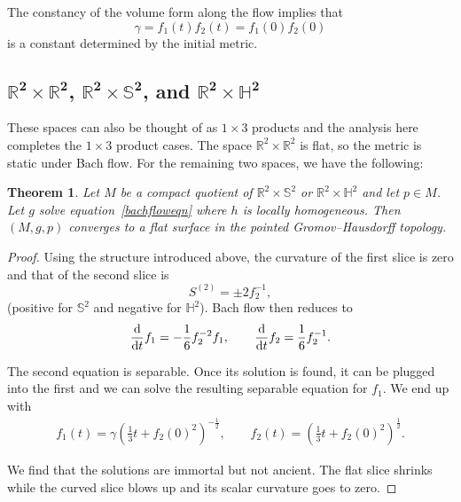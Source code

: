 \documentclass[pdftex]{sigma}
\numberwithin{equation}{section}
\newtheorem{Theorem}{Theorem}[section]
\newcommand{\dtime}{\frac{{\rm d}}{{\rm d} t}} %
\begin{document}
The constancy of the volume form along the flow implies that
\[
\gamma = f_1(t) f_2(t) = f_1(0) f_2(0)
\]
is a constant determined by the initial metric.

\subsection[$\mathbb{R}^2 \times \mathbb{R}^2$, $\mathbb{R}^2 \times \mathbb{S}^2$, and $\mathbb{R}^2 \times \mathbb{H}^2$]{$\boldsymbol{\mathbb{R}^2 \times \mathbb{R}^2}$, $\boldsymbol{\mathbb{R}^2 \times \mathbb{S}^2}$, and $\boldsymbol{\mathbb{R}^2 \times \mathbb{H}^2}$}

These spaces can also be thought of as $1 \times 3$ products and the analysis here completes the $1 \times 3$ product cases. The space $\mathbb{R}^2 \times \mathbb{R}^2$ is flat, so the metric is static under Bach flow. For the remaining two spaces, we have the following:

\begin{Theorem}Let $M$ be a compact quotient of $\mathbb{R}^2 \times \mathbb{S}^2$ or $\mathbb{R}^2 \times \mathbb{H}^2$ and let $p \in M$. Let $g$ solve equation~\eqref{bachfloweqn} where $h$ is locally homogeneous. Then $(M, g, p)$ converges to a flat surface in the pointed Gromov--Hausdorff topology.
\end{Theorem}

\begin{proof}Using the structure introduced above, the curvature of the first slice is zero and that of the second slice is
\[
S^{(2)} = \pm 2 f_2^{-1},
\]
(positive for $\mathbb{S}^2$ and negative for $\mathbb{H}^2$). Bach flow then reduces to
\begin{equation*}
\dtime f_1 = -\frac{1}{6} f_2^{-2} f_1,\qquad
\dtime f_2 = \frac{1}{6} f_2^{-1}.
\end{equation*}

The second equation is separable. Once its solution is found, it can be plugged into the first and we can solve the resulting separable equation for $f_1$. We end up with
\begin{gather*}
f_1(t) = \gamma \left(\frac{1}{3} t + f_2(0)^2 \right)^{-\frac{1}{2}},\qquad
f_2(t) = \left(\frac{1}{3} t + f_2(0)^2 \right)^{\frac{1}{2}}.
\end{gather*}

We find that the solutions are immortal but not ancient. The flat slice shrinks while the curved slice blows up and its scalar curvature goes to zero.
\end{proof}
\end{document}
